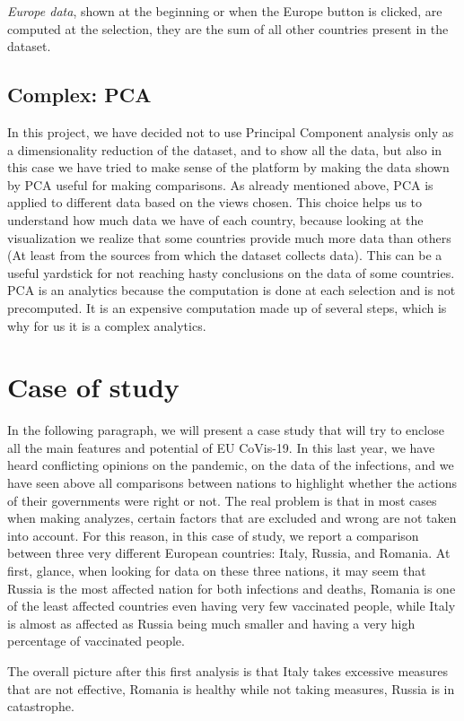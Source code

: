\documentclass[10pt,conference]{IEEEtran}
\begin{document}
{\em Europe data}, shown at the beginning or when the Europe button is clicked, are computed at the selection, they are the sum of all other countries present in the dataset.

\subsection{Complex: PCA}
In this project, we have decided not to use Principal Component analysis only as a dimensionality reduction of the dataset, and to show all the data, but also in this case we have tried to make sense of the platform by making the data shown by PCA useful for making comparisons. As already mentioned above, PCA is applied to different data based on the views chosen. This choice helps us to understand how much data we have of each country, because looking at the visualization we realize that some countries provide much more data than others (At least from the sources from which the dataset collects data). This can be a useful yardstick for not reaching hasty conclusions on the data of some countries. PCA is an analytics because the computation is done at each selection and is not precomputed. It is an expensive computation made up of several steps, which is why for us it is a complex analytics.


\section{Case of study}
In the following paragraph, we will present a case study that will try to enclose all the main features and potential of EU CoVis-19. In this last year, we have heard conflicting opinions on the pandemic, on the data of the infections, and we have seen above all comparisons between nations to highlight whether the actions of their governments were right or not. The real problem is that in most cases when making analyzes, certain factors that are excluded and wrong are not taken into account. For this reason, in this case of study, we report a comparison between three very different European countries: Italy, Russia, and Romania. At first, glance, when looking for data on these three nations, it may seem that Russia is the most affected nation for both infections and deaths, Romania is one of the least affected countries even having very few vaccinated people, while Italy is almost as affected as Russia being much smaller and having a very high percentage of vaccinated people.

The overall picture after this first analysis is that Italy takes excessive measures that are not effective, Romania is healthy while not taking measures, Russia is in catastrophe.
\end{document}
